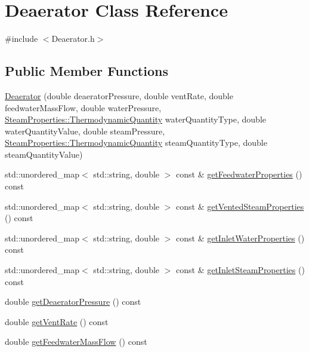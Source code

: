 \hypertarget{class_deaerator}{}\section{Deaerator Class Reference}
\label{class_deaerator}


{\ttfamily \#include $<$Deaerator.\+h$>$}

\subsection*{Public Member Functions}
\begin{DoxyCompactItemize}
\item 
\hyperlink{class_deaerator_a02311c34cbe46384187292e5f844984c}{Deaerator} (double deaerator\+Pressure, double vent\+Rate, double feedwater\+Mass\+Flow, double water\+Pressure, \hyperlink{class_steam_properties_ae0294bedf7d178c2d8fb6aed0f62fbff}{Steam\+Properties\+::\+Thermodynamic\+Quantity} water\+Quantity\+Type, double water\+Quantity\+Value, double steam\+Pressure, \hyperlink{class_steam_properties_ae0294bedf7d178c2d8fb6aed0f62fbff}{Steam\+Properties\+::\+Thermodynamic\+Quantity} steam\+Quantity\+Type, double steam\+Quantity\+Value)
\item 
std\+::unordered\+\_\+map$<$ std\+::string, double $>$ const  \& \hyperlink{class_deaerator_a74f7916b125f4964b0f534940f590633}{get\+Feedwater\+Properties} () const
\item 
std\+::unordered\+\_\+map$<$ std\+::string, double $>$ const  \& \hyperlink{class_deaerator_aba77ebc41e5b05d6e2463793bacbcbc0}{get\+Vented\+Steam\+Properties} () const
\item 
std\+::unordered\+\_\+map$<$ std\+::string, double $>$ const  \& \hyperlink{class_deaerator_a6dccf8495324c76a5d9b6128c57c0427}{get\+Inlet\+Water\+Properties} () const
\item 
std\+::unordered\+\_\+map$<$ std\+::string, double $>$ const  \& \hyperlink{class_deaerator_ae777da23f2504f8724850946378b3cf5}{get\+Inlet\+Steam\+Properties} () const
\item 
double \hyperlink{class_deaerator_ac16cacdeef74e45f951fe992bac4e9e3}{get\+Deaerator\+Pressure} () const
\item 
double \hyperlink{class_deaerator_ad0262491c2bd9a6f820eaaba54498bcd}{get\+Vent\+Rate} () const
\item 
double \hyperlink{class_deaerator_ae1524e8b406c3d5c2823ae4e6bafe389}{get\+Feedwater\+Mass\+Flow} () const
\item 

\end{DoxyCompactItemize}
